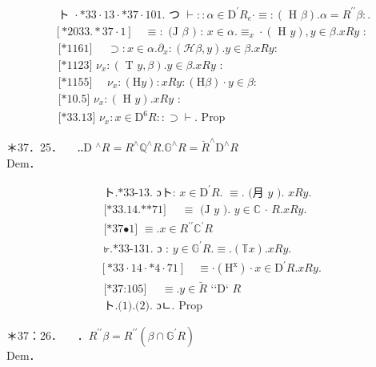 \documentclass[10pt]{article}
\begin{document}
$$
\begin{aligned}
& \text { ト } \cdot * 33 \cdot 13 \cdot * 37 \cdot 101 . \text { つ } \vdash:: \alpha \in \mathrm{D}^{\prime} R_{e} \cdot \equiv:(\text { H } \beta) . \alpha=R^{\prime \prime} \beta: . \\
& {[* 2033 . * 37 \cdot 1] \quad \equiv: \text { (J } \beta \text { ) : } x \in \alpha . \equiv_{x} \cdot(\text { H } y), y \in \beta . x R y \text { : }} \\
& \text { [*1161] } \quad \supset: x \in \alpha . \partial_{x}:(\mathcal{H} \beta, y) . y \in \beta . x R y: \\
& \text { [*1123] } \nu_{x}:(\text { T } y, \beta) . y \in \beta . x R y \text { : } \\
& \text { [*1155] } \quad \nu_{x}:(\mathrm{H} y): x R y:(\mathrm{H} \beta) \cdot y \in \beta: \\
& \text { [*10.5] } \nu_{x}:(\text { H } y) . x R y \text { : } \\
& \text { [*33.13] } \nu_{x}: x \in \mathrm{D}^{6} R:: \supset \vdash \text {. Prop }
\end{aligned}
$$

＊37．25．$\quad$ ‥D ${ }^{\wedge} R=R^{\wedge} \mathbb{Q}^{\wedge} R . \mathbb{G}^{\wedge} R=\breve{R}^{\wedge} \mathrm{D}^{\wedge} R$\\
Dem．


\begin{align*}
& \text { ト.*33-13. ɔト: } x \in \mathrm{D}^{\prime} R \text {. } \equiv \text {. (月 } y \text { ). } x R y \text {. } \\
& \text { [*33.14.**71] } \quad \equiv \text { (J } y \text { ). } y \in \mathbb{C} \text { ⋅ } R . x R y \text {. } \\
& \text { [*37•1] } \equiv . x \in R^{\prime \prime} \mathbb{C}^{\prime} R  \tag{1}\\
& \text { ৮.*33-131. ɔ : } y \in \mathbb{G}^{\prime} R . \equiv .(\mathbb{T} x) . x R y \text {. } \\
& {[* 33 \cdot 14 \cdot * 4 \cdot 71] \quad \equiv \cdot\left(\mathrm{H}^{\mathrm{x}}\right) \cdot x \in \mathrm{D}^{\prime} R . x R y \text {. }} \\
& \text { [*37:105] } \quad \equiv . y \in \breve{R} \text { ‘‘D‘ } R  \tag{2}\\
& \text { ト.(1).(2). ɔㄴ. Prop }
\end{align*}


＊37：26．$\quad$ ．$R^{\prime \prime} \beta=R^{\prime \prime}\left(\beta \cap \mathbb{G}^{\prime} R\right)$\\
Dem．
\end{document}
